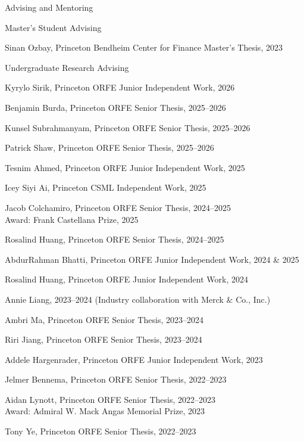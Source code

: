 \documentclass{resume}
\begin{document}
\begin{rSection}{Advising and Mentoring}
\begin{rSubsection}{Master's Student Advising}{}{}{}
\item {Sinan Ozbay, Princeton Bendheim Center for Finance Master's Thesis, 2023}
\end{rSubsection}

\begin{rSubsection}{Undergraduate Research Advising}{}{}{}
\item {Kyrylo Sirik, Princeton ORFE Junior Independent Work, 2026}
\item {Benjamin Burda, Princeton ORFE Senior Thesis, 2025--2026}
\item {Kunsel Subrahmanyam, Princeton ORFE Senior Thesis, 2025--2026}
\item {Patrick Shaw, Princeton ORFE Senior Thesis, 2025--2026}
\item {Tesnim Ahmed, Princeton ORFE Junior Independent Work, 2025}
\item {Icey Siyi Ai, Princeton CSML Independent Work, 2025}
\item {Jacob Colchamiro, Princeton ORFE Senior Thesis, 2024--2025 \\
Award: Frank Castellana Prize, 2025}
\item {Rosalind Huang, Princeton ORFE Senior Thesis, 2024--2025}
\item {AbdurRahman Bhatti, Princeton ORFE Junior Independent Work, 2024 \& 2025}
\item {Rosalind Huang, Princeton ORFE Junior Independent Work, 2024}
\item {Annie Liang, 2023--2024 (Industry collaboration with Merck \& Co., Inc.)}
\item {Ambri Ma, Princeton ORFE Senior Thesis, 2023--2024}
\item {Riri Jiang, Princeton ORFE Senior Thesis, 2023--2024}
\item {Addele Hargenrader, Princeton ORFE Junior Independent Work, 2023}
\item {Jelmer Bennema, Princeton ORFE Senior Thesis, 2022--2023}
\item {Aidan Lynott, Princeton ORFE Senior Thesis, 2022--2023 \\
Award: Admiral W. Mack Angas Memorial Prize, 2023}
\item {Tony Ye, Princeton ORFE Senior Thesis, 2022--2023 \\
}
\end{rSubsection}
\end{rSection}
\end{document}
